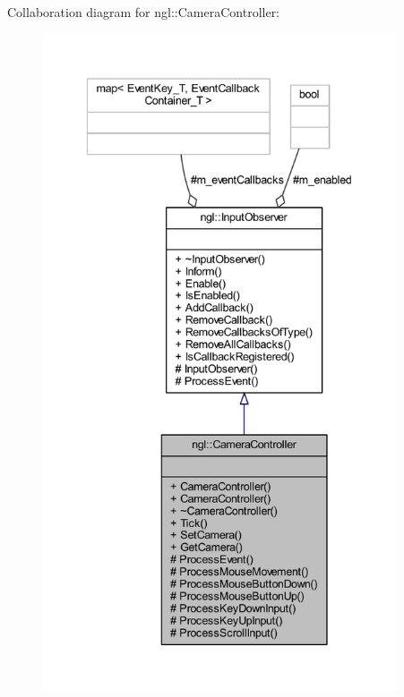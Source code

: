 Collaboration diagram for ngl\+:\+:Camera\+Controller\+:
\nopagebreak
\begin{figure}[H]
\begin{center}
\leavevmode
\includegraphics[height=550pt]{classngl_1_1_camera_controller__coll__graph}
\end{center}
\end{figure}
